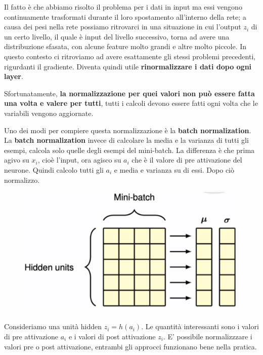 Il fatto è che abbiamo risolto il problema per i dati in input ma essi vengono continuamente trasformati durante il loro spostamento all'interno della rete; a causa dei pesi nella rete possiamo ritrovarci in una situazione in cui l'output $z_i$ di un certo livello, il quale è input del livello successivo, torna ad avere una distribuzione sfasata, con alcune feature molto grandi e altre molto piccole. In questo contesto ci ritroviamo ad avere esattamente gli stessi problemi precedenti, rigurdanti il gradiente. Diventa quindi utile \textbf{rinormalizzare i dati dopo ogni layer}.



Sfortunatamente, \textbf{la normalizzazione per quei valori non può essere fatta una volta e valere per tutti}, tutti i calcoli devono essere fatti ogni volta che le variabili vengono aggiornate.


Uno dei modi per compiere questa normalizzazione è la \textbf{batch normalization}. La \textbf{batch normalization} invece di calcolare  la media e la varianza di tutti gli esempi, calcola solo quelle degli esempi del mini-batch. La differenza è che prima agivo su $x_i$, cioè l'input, ora agisco su $a_i$ che è il valore di pre attivazione del neurone. Quindi calcolo tutti gli $a_i$ e media e varianza su di essi. Dopo ciò normalizzo. 
\begin{figure}[h]
    \includegraphics[scale=.3]{images/best_practices/batch_norm.png}
    \centering
\end{figure}



Consideriamo una unità hidden $z_i=h(a_i)$. Le quantità interessanti sono i valori di pre attivazione $a_i$ e i valori di post attivazione $z_i$. E' possibile normalizzzare i valori pre o post attivazione, entrambi gli approcci funzionano bene nella pratica.



